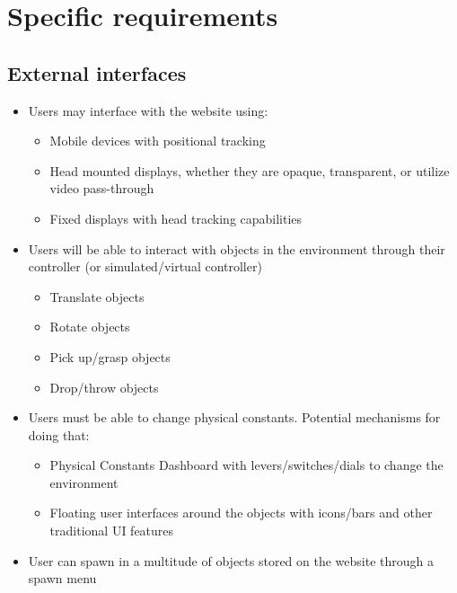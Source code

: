 \section{Specific requirements}
\subsection{External interfaces}
\begin{itemize}
    \item Users may interface with the website using:
    \begin{itemize}
    \item Mobile devices with positional tracking
        \item Head mounted displays, whether they are opaque, transparent, or utilize video pass-through
        \item Fixed displays with head tracking capabilities
    \end{itemize}
    \item Users will be able to interact with objects in the environment through their controller (or simulated/virtual controller)
    \begin{itemize}
        \item Translate objects
        \item Rotate objects
        \item Pick up/grasp objects
        \item Drop/throw objects
    \end{itemize}
    \item Users must be able to change physical constants.  Potential mechanisms for doing that:
    \begin{itemize}
        \item Physical Constants Dashboard with levers/switches/dials to change the environment
        \item Floating user interfaces around the objects with icons/bars and other traditional UI features
    \end{itemize}
    \item User can spawn in a multitude of objects stored on the website through a spawn menu
        
\end{itemize}

